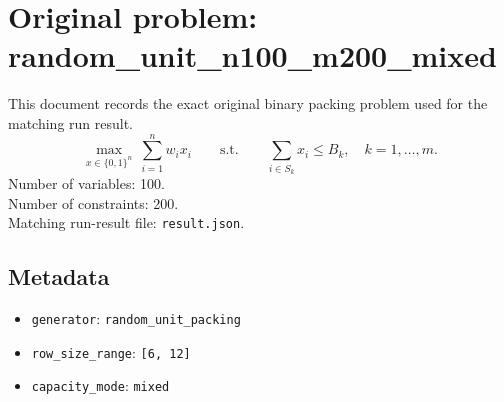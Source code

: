 \documentclass[11pt]{article}
\begin{document}
\section*{Original problem: random\_unit\_n100\_m200\_mixed}
This document records the exact original binary packing problem used for the matching run result.
\[
\max_{x\in\{0,1\}^n}\ \sum_{i=1}^n w_i x_i
\qquad\text{s.t.}\qquad
\sum_{i\in S_k} x_i \le B_k,\quad k=1,\dots,m.
\]
Number of variables: 100.\\
Number of constraints: 200.\\
Matching run-result file: \texttt{result.json}.
\subsection*{Metadata}
\begin{itemize}
\item \texttt{generator}: \texttt{random\_unit\_packing}
\item \texttt{row\_size\_range}: \texttt{[6, 12]}
\item \texttt{capacity\_mode}: \texttt{mixed}
\end{itemize}
\end{document}
